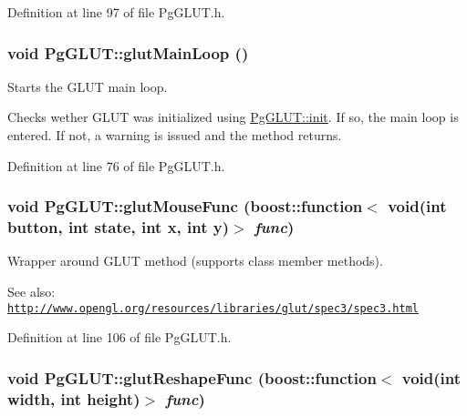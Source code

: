 Definition at line 97 of file PgGLUT.h.\hypertarget{namespace_pg_g_l_u_t_161a4c69d2edbcd21fee91d128a3ef54}{
\subsubsection[glutMainLoop]{\setlength{\rightskip}{0pt plus 5cm}void PgGLUT::glutMainLoop ()}}
\label{namespace_pg_g_l_u_t_161a4c69d2edbcd21fee91d128a3ef54}


Starts the GLUT main loop. 

Checks wether GLUT was initialized using \hyperlink{namespace_pg_g_l_u_t_95723231de4f81fc9e6596a7f60f0811}{PgGLUT::init}. If so, the main loop is entered. If not, a warning is issued and the method returns. 

Definition at line 76 of file PgGLUT.h.\hypertarget{namespace_pg_g_l_u_t_2226e9d474845b2fcfdd75bf5ab78ff3}{
\subsubsection[glutMouseFunc]{\setlength{\rightskip}{0pt plus 5cm}void PgGLUT::glutMouseFunc (boost::function$<$ void(int button, int state, int x, int y)$>$ {\em func})}}
\label{namespace_pg_g_l_u_t_2226e9d474845b2fcfdd75bf5ab78ff3}


Wrapper around GLUT method (supports class member methods). 

\begin{Desc}
\item[See also:]\href{http://www.opengl.org/resources/libraries/glut/spec3/spec3.html}{\tt http://www.opengl.org/resources/libraries/glut/spec3/spec3.html} \end{Desc}


Definition at line 106 of file PgGLUT.h.\hypertarget{namespace_pg_g_l_u_t_a22fdd9d50c60d0261be08fc9ae23c8b}{
\subsubsection[glutReshapeFunc]{\setlength{\rightskip}{0pt plus 5cm}void PgGLUT::glutReshapeFunc (boost::function$<$ void(int width, int height)$>$ {\em func})}}
\label{namespace_pg_g_l_u_t_a22fdd9d50c60d0261be08fc9ae23c8b}


